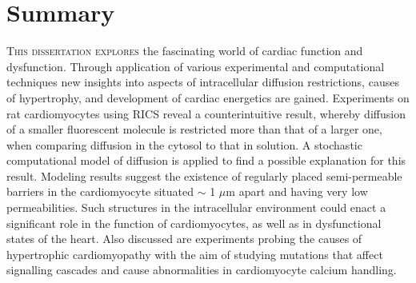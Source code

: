 \chapter*{Summary}
\lettrine[lines=2, lhang=0.33, loversize=0.25]{T}{his
dissertation explores} the fascinating world of cardiac function
and dysfunction. Through application of various experimental and
computational techniques new insights into aspects of intracellular diffusion
restrictions, causes of hypertrophy, and development of cardiac
energetics are gained. Experiments on rat cardiomyocytes using \acl{RICS} reveal a
counterintuitive result, whereby diffusion of a smaller fluorescent
molecule is restricted more than that of a larger one, when
comparing diffusion in the cytosol to that in solution. A stochastic
computational model of diffusion is applied to find a
possible explanation for this result. Modeling results suggest the existence
of regularly placed semi-permeable barriers in the cardiomyocyte
situated $\sim$ 1 $\mu$m apart and having very low permeabilities.
Such structures in the intracellular environment could enact a
significant role in the function of cardiomyocytes, as well as in
dysfunctional states of the heart. Also discussed are experiments 
probing the causes of hypertrophic cardiomyopathy with the aim of
studying mutations that affect signalling cascades and cause
abnormalities in cardiomyocyte calcium handling.

